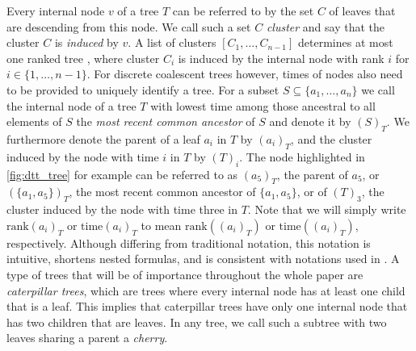 \documentclass[11pt]{amsart}
\newcommand{\rank}{\mathrm{rank}}
\newcommand{\ntime}{\mathrm{time}}
\begin{document}
Every internal node $v$ of a tree $T$ can be referred to by the set $C$ of leaves that are descending from this node.
We call such a set $C$ \emph{cluster} and say that the cluster $C$ is \emph{induced} by $v$.
A list of clusters $[C_1, \ldots, C_{n-1}]$ determines at most one ranked tree \autocite{Collienne2021}, where cluster $C_i$ is induced by the internal node with rank $i$ for $i \in \{1, \ldots, n-1\}$.
For discrete coalescent trees however, times of nodes also need to be provided to uniquely identify a tree.
For a subset $S \subseteq \{a_1, \ldots, a_n\}$ we call the internal node of a tree $T$ with lowest time among those ancestral to all elements of $S$ the \emph{most recent common ancestor} of $S$ and denote it by $(S)_T$.
We furthermore denote the parent of a leaf $a_i$ in $T$ by $(a_i)_T$, and the cluster induced by the node with time $i$ in $T$ by $(T)_i$.
The node highlighted in \autoref{fig:dtt_tree} for example can be referred to as $(a_5)_T$, the parent of $a_5$, or $(\{a_1, a_5\})_T$, the most recent common ancestor of $\{a_1, a_5\}$, or of $(T)_3$, the cluster induced by the node with time three in $T$.
Note that we will simply write $\rank(a_i)_T$ or $\ntime(a_i)_T$ to mean $\rank((a_i)_T)$ or $\ntime((a_i)_T)$, respectively.
Although differing from traditional notation, this notation is intuitive, shortens nested formulas, and is consistent with notations used in \autocite{Collienne2021}.
A type of trees that will be of importance throughout the whole paper are \emph{caterpillar trees}, which are trees where every internal node has at least one child that is a leaf.
This implies that caterpillar trees have only one internal node that has two children that are leaves.
In any tree, we call such a subtree with two leaves sharing a parent a \emph{cherry}.
\end{document}
